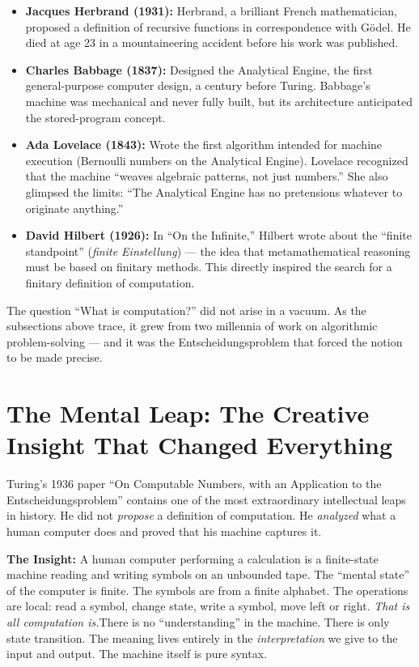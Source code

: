 \begin{itemize}
\item \textbf{Jacques Herbrand (1931):} Herbrand, a brilliant French mathematician, proposed a definition of recursive functions in correspondence with G\"odel. He died at age 23 in a mountaineering accident before his work was published.
\item \textbf{Charles Babbage (1837):} Designed the Analytical Engine, the first general-purpose computer design, a century before Turing. Babbage's machine was mechanical and never fully built, but its architecture anticipated the stored-program concept.
\item \textbf{Ada Lovelace (1843):} Wrote the first algorithm intended for machine execution (Bernoulli numbers on the Analytical Engine). Lovelace recognized that the machine ``weaves algebraic patterns, not just numbers.'' She also glimpsed the limits: ``The Analytical Engine has no pretensions whatever to originate anything.''
\item \textbf{David Hilbert (1926):} In ``On the Infinite,'' Hilbert wrote about the ``finite standpoint'' (\emph{finite Einstellung}) --- the idea that metamathematical reasoning must be based on finitary methods. This directly inspired the search for a finitary definition of computation.
\end{itemize}

The question ``What is computation?'' did not arise in a vacuum. As the subsections above trace, it grew from two millennia of work on algorithmic problem-solving --- and it was the Entscheidungsproblem that forced the notion to be made precise.

\section{The Mental Leap: The Creative Insight That Changed Everything}
\label{sec:computation:leap}

Turing's 1936 paper ``On Computable Numbers, with an Application to the Entscheidungsproblem'' contains one of the most extraordinary intellectual leaps in history. He did not \emph{propose} a definition of computation. He \emph{analyzed} what a human computer does and proved that his machine captures it.

\textbf{The Insight:} A human computer performing a calculation is a finite-state machine reading and writing symbols on an unbounded tape. The ``mental state'' of the computer is finite. The symbols are from a finite alphabet. The operations are local: read a symbol, change state, write a symbol, move left or right. \emph{That is all computation is.}There is no ``understanding'' in the machine. There is only state transition. The meaning lives entirely in the \emph{interpretation} we give to the input and output. The machine itself is pure syntax.

